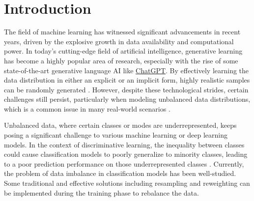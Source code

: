 \chapter{Introduction}
\label{chap-intro}
The field of machine learning has witnessed significant advancements in recent years, driven by the explosive growth in data availability and computational power. In today's cutting-edge field of artificial intelligence, generative learning has become a highly popular area of research, especially with the rise of some state-of-the-art generative language AI like \href{https://openai.com/chatgpt/}{ChatGPT}. By effectively learning the data distribution in either an explicit or an implicit form, highly realistic samples can be randomly generated \cite{bernardoGenerativeDiscriminativeGetting2007}. However, despite these technological strides, certain challenges still persist, particularly when modeling unbalanced data distributions, which is a common issue in many real-world scenarios \cite{chawlaDataMiningImbalanced2005}.

Unbalanced data, where certain classes or modes are underrepresented, keeps posing a significant challenge to various machine learning or deep learning models. In the context of discriminative learning, the inequality between classes could cause classification models to poorly generalize to minority classes, leading to a poor prediction performance on those underrepresented classes \cite{chawlaDataMiningImbalanced2005,heLearningImbalancedData2009}. Currently, the problem of data imbalance in classification models has been well-studied. Some traditional and effective solutions including resampling and reweighting can be implemented during the training phase to rebalance the data.

